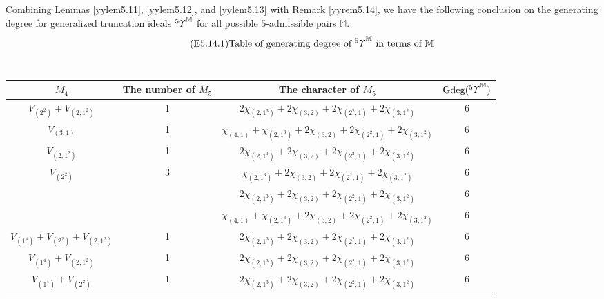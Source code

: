 \documentclass{amsart}
\theoremstyle{definition}
\theoremstyle{remark}
\numberwithin{equation}{section}
\def\gd{\operatorname{Gdeg}}
\newcommand{\upa}[1]{{^{#1}{\it \!\Upsilon}}}
\begin{document}
Combining Lemmas \ref{yylem5.11}, \ref{yylem5.12}, 
and \ref{yylem5.13} with Remark \ref{yyrem5.14}, we have 
the following conclusion on the generating degree for 
generalized truncation ideals $\upa{5}^{\mathbb M}$ for
all possible $5$-admissible pairs ${\mathbb M}$.
\begin{equation}
\label{E5.14.1}\tag{E5.14.1}
{\text{Table of generating degree of $\upa{5}^{\mathbb M}$ in terms of
${\mathbb M}$}}
\end{equation}
~\begin{center}
\begin{tabular}{|c|c|c|c|}
\hline
		$M_4$                               & The number of $M_5$                & The character of $M_5$                                                      & $\gd(\upa{5}^{\mathbb M})$ \\ \hline
		$V_{(2^2)}+V_{(2,1^2)}$             & 1                                  & $2\chi_{(2,1^3)}+2\chi_{(3,2)}+2\chi_{(2^2,1)}+2\chi_{(3,1^2)}$             & 6     \\ \hline
		$V_{(3,1)}$                         & 1                                  & $\chi_{(4,1)}+\chi_{(2,1^3)}+2\chi_{(3,2)}+2\chi_{(2^2,1)}+2\chi_{(3,1^2)}$ & 6     \\ \hline
		$V_{(2,1^2)}$                       & 1                                  & $2\chi_{(2,1^3)}+2\chi_{(3,2)}+2\chi_{(2^2,1)}+2\chi_{(3,1^2)}$             & 6     \\ \hline
		\multirow{3}{*}{$V_{(2^2)}$}        & \multirow{3}{*}{3}                 & $\chi_{(2,1^3)}+2\chi_{(3,2)}+2\chi_{(2^2,1)}+2\chi_{(3,1^2)}$             & 6     \\
		\cline{3-4}
		&                                    & $2\chi_{(2,1^3)}+2\chi_{(3,2)}+2\chi_{(2^2,1)}+2\chi_{(3,1^2)}$ & 6     \\ 
		\cline{3-4}
		&                                    & $\chi_{(4,1)}+\chi_{(2,1^3)}+2\chi_{(3,2)}+2\chi_{(2^2,1)}+2\chi_{(3,1^2)}$ & 6     \\ \hline
		$V_{(1^4)}+V_{(2^2)}+V_{(2,1^2)}$   & 1                                  & $2\chi_{(2,1^3)}+2\chi_{(3,2)}+2\chi_{(2^2,1)}+2\chi_{(3,1^2)}$             & 6     \\ \hline
		$V_{(1^4)}+V_{(2,1^2)}$             & 1                                  & $2\chi_{(2,1^3)}+2\chi_{(3,2)}+2\chi_{(2^2,1)}+2\chi_{(3,1^2)}$             & 6     \\ \hline
		$V_{(1^4)}+V_{(2^2)}$               & 1                                  & $2\chi_{(2,1^3)}+2\chi_{(3,2)}+2\chi_{(2^2,1)}+2\chi_{(3,1^2)}$             & 6     \\ \hline

\end{tabular}
\end{center}
\end{document}
